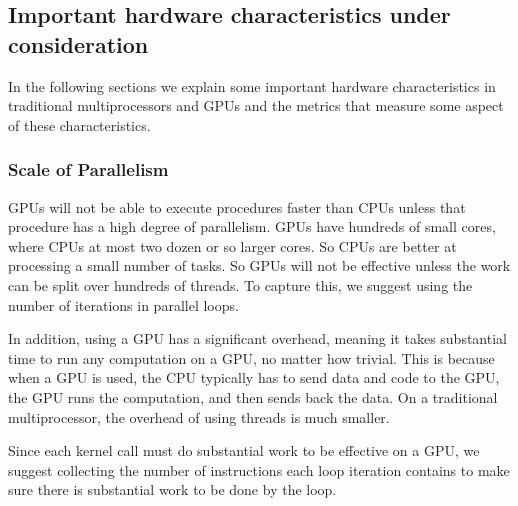 \documentclass[12pt,twoside]{reedthesis}
\begin{document}
		\subsection{Important hardware characteristics under consideration}
		
		
		In the following sections we explain some important hardware characteristics in traditional multiprocessors and GPUs and the metrics that measure some aspect of these characteristics. 
		
		\subsubsection{Scale of Parallelism}
		
		GPUs will not be able to execute procedures faster than CPUs unless that procedure has a high degree of parallelism. 
		GPUs have hundreds of small cores, where CPUs at most two dozen or so larger cores. So CPUs are better at processing a small number of tasks. So GPUs will not be effective unless the work can be split over hundreds of threads. To capture this, we suggest using the number of iterations in parallel loops.
		
		In addition, using a GPU has a significant overhead, meaning it takes substantial time to run any computation on a GPU, no matter how trivial. This is because when a GPU is used, the CPU typically has to send data and code to the GPU, the GPU runs the computation, and then sends back the data. On a traditional multiprocessor, the overhead of using threads is much smaller. %
		
		Since each kernel call must do substantial work to be effective on a GPU, %
		we suggest collecting the number of instructions each loop iteration contains to make sure there is substantial work to be done by the loop.
		
		
\end{document}
